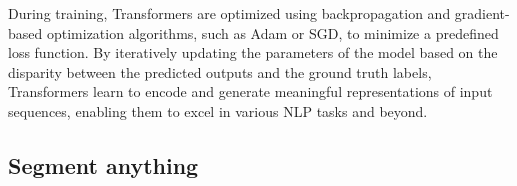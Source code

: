 During training, Transformers are optimized using backpropagation and gradient-based optimization algorithms, such as Adam or SGD, to minimize a predefined loss function. By iteratively updating the parameters of the model based on the disparity between the predicted outputs and the ground truth labels, Transformers learn to encode and generate meaningful representations of input sequences, enabling them to excel in various NLP tasks and beyond.





























  \subsection{Segment anything}